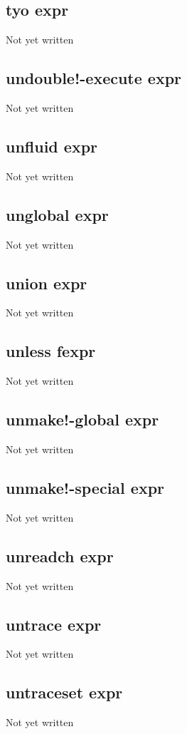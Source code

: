 \documentclass[a4paper,11pt]{article}
\begin{document}
{\subsection{\ttfamily tyo expr}
   Not yet written

\subsection{\ttfamily undouble!-execute expr}
   Not yet written

\subsection{\ttfamily unfluid expr}
   Not yet written

\subsection{\ttfamily unglobal expr}
   Not yet written

\subsection{\ttfamily union expr}
   Not yet written

\subsection{\ttfamily unless fexpr}
   Not yet written

\subsection{\ttfamily unmake!-global expr}
   Not yet written

\subsection{\ttfamily unmake!-special expr}
   Not yet written

\subsection{\ttfamily unreadch expr}
   Not yet written

\subsection{\ttfamily untrace expr}
   Not yet written

\subsection{\ttfamily untraceset expr}
   Not yet written

}
\end{document}
